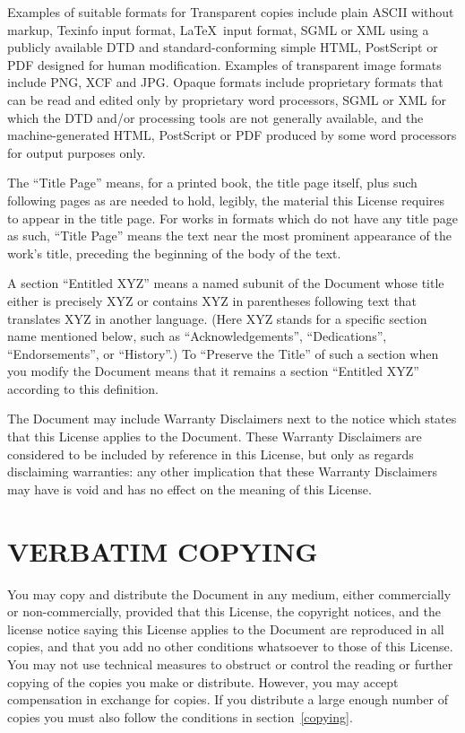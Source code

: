 \documentclass[10pt,a4paper,titlepage,twoside,openright]{report}
\begin{document}
Examples of suitable formats for Transparent copies include plain
ASCII without markup, Texinfo input format, \LaTeX\ input format, SGML
or XML using a publicly available DTD and standard-conforming simple
HTML, PostScript or PDF designed for human modification. Examples of
transparent image formats include PNG, XCF and JPG. Opaque formats
include proprietary formats that can be read and edited only by
proprietary word processors, SGML or XML for which the DTD and/or
processing tools are not generally available, and the
machine-generated HTML, PostScript or PDF produced by some word
processors for output purposes only.

The ``Title Page'' means, for a printed book, the title page itself,
plus such following pages as are needed to hold, legibly, the material
this License requires to appear in the title page.  For works in
formats which do not have any title page as such, ``Title Page'' means
the text near the most prominent appearance of the work's title,
preceding the beginning of the body of the text.

A section ``Entitled XYZ'' means a named subunit of the Document whose
title either is precisely XYZ or contains XYZ in parentheses following
text that translates XYZ in another language.  (Here XYZ stands for a
specific section name mentioned below, such as ``Acknowledgements'',
``Dedications'', ``Endorsements'', or ``History''.)  To ``Preserve the Title''
of such a section when you modify the Document means that it remains a
section ``Entitled XYZ'' according to this definition.

The Document may include Warranty Disclaimers next to the notice which
states that this License applies to the Document.  These Warranty
Disclaimers are considered to be included by reference in this
License, but only as regards disclaiming warranties: any other
implication that these Warranty Disclaimers may have is void and has
no effect on the meaning of this License.


\section*{VERBATIM COPYING}
\label{verbatim}

You may copy and distribute the Document in any medium, either
commercially or non-commercially, provided that this License, the
copyright notices, and the license notice saying this License applies
to the Document are reproduced in all copies, and that you add no other
conditions whatsoever to those of this License.  You may not use
technical measures to obstruct or control the reading or further
copying of the copies you make or distribute.  However, you may accept
compensation in exchange for copies.  If you distribute a large enough
number of copies you must also follow the conditions in
section~\ref{copying}.
\end{document}
